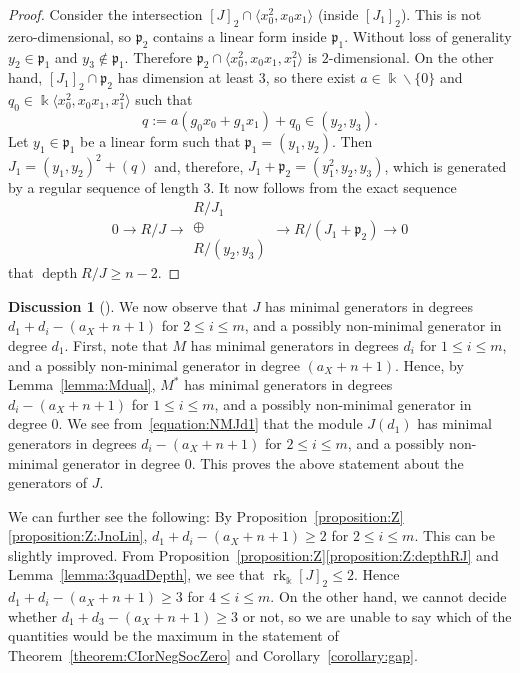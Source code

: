 \documentclass[11pt,a4paper]{amsart}
\theoremstyle{plain}
\theoremstyle{definition}
\newtheorem{discussion}[equation]{Discussion}
\newenvironment{discussionbox}[1][]{%
    \begin{discussion}[#1]\pushQED{\qed}}{\popQED \end{discussion}}
\newcommand{\frakp}{{\mathfrak p}}
\DeclareMathOperator{\rank}{rk}
\DeclareMathOperator{\depth}{depth}
\newcommand{\minus}{\ensuremath{\smallsetminus}}
\begin{document}
\begin{proof}
Consider the intersection $[J]_2 \cap \langle x_0^2, x_0x_1 \rangle$
(inside $[J_1]_2$). This is not zero-dimensional, so $\frakp_2$ contains a
linear form inside $\frakp_1$.
Without loss of generality $y_2 \in
\frakp_1$ and $y_3 \not \in \frakp_1$. Therefore 
$\frakp_2 \cap \langle x_0^2, x_0x_1, x_1^2 \rangle$ is $2$-dimensional.
On the other hand, $[J_1]_2 \cap \frakp_2$ has dimension at least $3$,
so there exist $a \in \Bbbk \minus \{0 \}$ and $q_0 \in \Bbbk \langle x_0^2,
x_0x_1, x_1^2 \rangle$ such that 
\[
q := a(g_0x_0 + g_1x_1) + q_0 \in (y_2, y_3 ).
\]
Let $y_1 \in \frakp_1$ be a linear form such that $\frakp_1 = (y_1, y_2)$.
Then $J_1 = (y_1, y_2)^2 + (q)$ and, therefore, 
$J_1 + \frakp_2 =  (y_1^2, y_2, y_3)$, which is generated by a regular
sequence of length $3$. 
It now follows from the exact sequence 
\[
0 \to R/J \to 
\begin{matrix}
R/J_1 \\ \oplus \\ R/(y_2, y_3) 
\end{matrix}
\to R/(J_1 + \frakp_2) \to 0
\]
that $\depth R/J \geq n-2$.
\end{proof}

\begin{discussionbox}
%
We now observe that $J$ has minimal generators in degrees $d_1 + d_i - (a_X
+ n + 1)$ for $2 \leq i \leq m$, and a possibly non-minimal generator in
degree $d_1$. First, note that $M$ has minimal generators in degrees $d_i$
for $1 \leq i \leq m$, and a possibly non-minimal generator in degree $(a_X
+ n + 1)$. Hence, by Lemma~\ref{lemma:Mdual}, $M^*$ has minimal generators
in degrees $d_i - (a_X + n + 1)$ for $1 \leq i \leq m$, and a possibly
non-minimal generator in degree $0$. We see from~\eqref{equation:NMJd1}
that the module $J(d_1)$ has minimal generators in degrees $d_i - (a_X + n
+ 1)$ for $2 \leq i \leq m$, and a possibly non-minimal generator in degree
$0$. This proves the above statement about the generators of $J$.

We can further see the following: 
By Proposition~\ref{proposition:Z}\eqref{proposition:Z:JnoLin}, $d_1 + d_i
- (a_X + n + 1) \geq 2$ for $2 \leq i \leq m$.
This can be slightly improved. From
Proposition~\ref{proposition:Z}\eqref{proposition:Z:depthRJ} and
Lemma~\ref{lemma:3quadDepth}, we see that $\rank_\Bbbk [J]_2 \leq 2$. Hence
$d_1 + d_i - (a_X + n + 1) \geq 3$ for $4 \leq i \leq m$.
On the other hand, we cannot decide whether 
$d_1 + d_3 - (a_X + n + 1) \geq 3$ or not, so we are unable to say which of
the quantities would be the maximum in the statement of 
Theorem~\ref{theorem:CIorNegSocZero} and Corollary~\ref{corollary:gap}.
\end{discussionbox}
\end{document}
